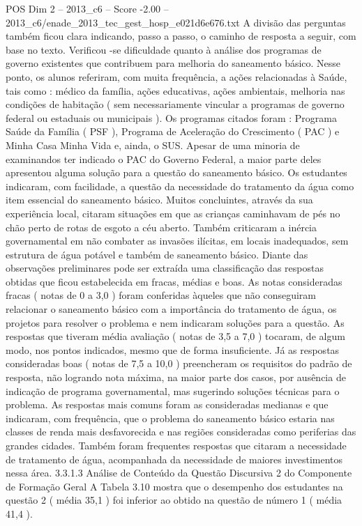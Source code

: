 \begin{textsample}{POS Dim 2 – 2013\_c6 – Score -2.00 – 2013\_c6/enade\_2013\_tec\_gest\_hosp\_e021d6e676.txt}
A divisão das perguntas também ficou clara indicando, passo a passo, o caminho de resposta a seguir, com base no texto.
Verificou -se dificuldade quanto à análise dos programas de governo existentes que contribuem para melhoria do saneamento básico.
Nesse ponto, os alunos referiram, com muita frequência, a ações relacionadas à Saúde, tais como : médico da família, ações educativas, ações ambientais, melhoria nas condições de habitação ( sem necessariamente vincular a programas de governo federal ou estaduais ou municipais ).
Os programas citados foram : Programa Saúde da Família ( PSF ), Programa de Aceleração do Crescimento ( PAC ) e Minha Casa Minha Vida e, ainda, o SUS.
Apesar de uma minoria de examinandos ter indicado o PAC do Governo Federal, a maior parte deles apresentou alguma solução para a questão do saneamento básico.
Os estudantes indicaram, com facilidade, a questão da necessidade do tratamento da água como item essencial do saneamento básico.
Muitos concluintes, através da sua experiência local, citaram situações em que as crianças caminhavam de pés no chão perto de rotas de esgoto a céu aberto.
Também criticaram a inércia governamental em não combater as invasões ilícitas, em locais inadequados, sem estrutura de água potável e também de saneamento básico.
Diante das observações preliminares pode ser extraída uma classificação das respostas obtidas que ficou estabelecida em fracas, médias e boas.
As notas consideradas fracas ( notas de 0 a 3,0 ) foram conferidas àqueles que não conseguiram relacionar o saneamento básico com a importância do tratamento de água, os projetos para resolver o problema e nem indicaram soluções para a questão.
As respostas que tiveram média avaliação ( notas de 3,5 a 7,0 ) tocaram, de algum modo, nos pontos indicados, mesmo que de forma insuficiente.
Já as respostas consideradas boas ( notas de 7,5 a 10,0 ) preencheram os requisitos do padrão de resposta, não logrando nota máxima, na maior parte dos casos, por ausência de indicação de programa governamental, mas sugerindo soluções técnicas para o problema.
As respostas mais comuns foram as consideradas medianas e que indicaram, com frequência, que o problema do saneamento básico estaria nas classes de renda mais desfavorecida e nas regiões consideradas como periferias das grandes cidades.
Também foram frequentes respostas que citaram a necessidade de tratamento de água, acompanhada da necessidade de maiores investimentos nessa área. 3.3.1.3 Análise de Conteúdo da Questão Discursiva 2 do Componente de Formação Geral A Tabela 3.10 mostra que o desempenho dos estudantes na questão 2 ( média 35,1 ) foi inferior ao obtido na questão de número 1 ( média 41,4 ).

\end{textsample}
